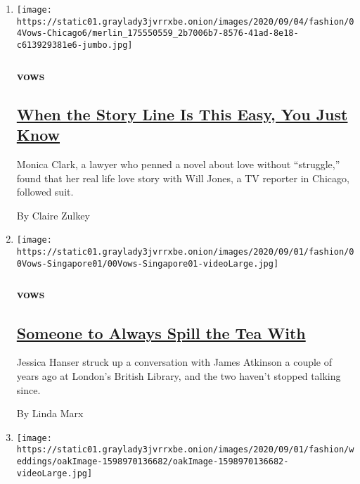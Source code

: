 \begin{enumerate}
\def\labelenumi{\arabic{enumi}.}
\item
  \texttt{[image: https://static01.graylady3jvrrxbe.onion/images/2020/09/04/fashion/04Vows-Chicago6/merlin\_175550559\_2b7006b7-8576-41ad-8e18-c613929381e6-jumbo.jpg]}

  \hypertarget{vows}{%
  \subsubsection{vows}\label{vows}}

  \hypertarget{when-the-story-line-is-this-easy-you-just-know}{%
  \subsection{\texorpdfstring{\href{/2020/09/04/fashion/weddings/Chicago-TV-reporter-William-Jones-Marries-Monica-Clark.html}{When
  the Story Line Is This Easy, You Just
  Know}}{When the Story Line Is This Easy, You Just Know}}\label{when-the-story-line-is-this-easy-you-just-know}}

  Monica Clark, a lawyer who penned a novel about love without
  ``struggle,'' found that her real life love story with Will Jones, a
  TV reporter in Chicago, followed suit.

  By Claire Zulkey
\item
  \texttt{[image: https://static01.graylady3jvrrxbe.onion/images/2020/09/01/fashion/00Vows-Singapore01/00Vows-Singapore01-videoLarge.jpg]}

  \hypertarget{vows-1}{%
  \subsubsection{vows}\label{vows-1}}

  \hypertarget{someone-to-always-spill-the-tea-with}{%
  \subsection{\texorpdfstring{\href{/2020/09/02/fashion/weddings/someone-to-always-spill-the-tea-with.html}{Someone
  to Always Spill the Tea
  With}}{Someone to Always Spill the Tea With}}\label{someone-to-always-spill-the-tea-with}}

  Jessica Hanser struck up a conversation with James Atkinson a couple
  of years ago at London's British Library, and the two haven't stopped
  talking since.

  By Linda Marx
\item
  \texttt{[image: https://static01.graylady3jvrrxbe.onion/images/2020/09/01/fashion/weddings/oakImage-1598970136682/oakImage-1598970136682-videoLarge.jpg]}


\end{enumerate}
